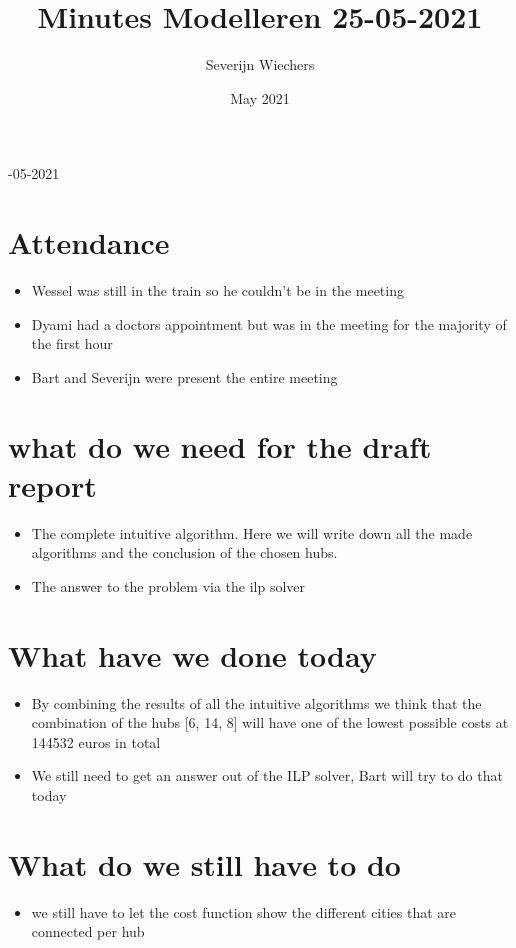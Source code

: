 \documentclass{article}
\title{Minutes Modelleren 25-05-2021}
\author{Severijn Wiechers}
\date{May 2021}
\begin{document}
-05-2021
\section{Attendance}
\begin{itemize}
    \item Wessel was still in the train so he couldn't be in the meeting
    \item Dyami had a doctors appointment but was in the meeting for the majority of the first hour
    \item Bart and Severijn were present the entire meeting
\end{itemize}

\section{what do we need for the draft report}
\begin{itemize}
    \item The complete intuitive algorithm. Here we will write down all the made algorithms and the conclusion of the chosen hubs.
    \item The answer to the problem via the ilp solver

\end{itemize}


\section{What have we done today}
\begin{itemize}
    \item By combining the results of all the intuitive algorithms we think that the combination of the hubs [6, 14, 8] will have one of the lowest possible costs at 144532 euros in total
    \item We still need to get an answer out of the ILP solver, Bart will try to do that today
\end{itemize}

\section{What do we still have to do}
\begin{itemize}
    \item we still have to let the cost function show the different cities that are connected per hub
\end{itemize}
\end{document}
